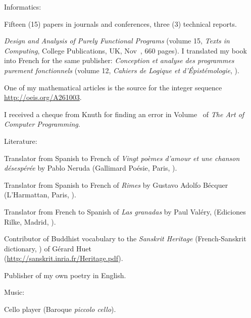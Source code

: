 \documentclass[a4paper,11pt]{article}
\begin{document}
\noindent Informatics:
\begin{itemize*}

  \item Fifteen (15) papers in journals and conferences, three (3)
    technical reports.

  \item \textit{Design and Analysis of Purely Functional Programs}
    (volume 15, \emph{Texts in Computing}, College Publications, UK,
    Nov~, 660 pages). I translated my book into
    French for the same publisher: \textit{Conception et analyse des
      programmes purement fonctionnels} (volume 12, \emph{Cahiers de
    Logique et d'Épistémologie}, ).

  \item One of my mathematical articles is the source for the integer
    sequence \url{http://oeis.org/A261003}.

  \item I received a cheque from Knuth for finding an error in
    Volume~ of \emph{The Art of Computer Programming}.

\end{itemize*}

\noindent Literature:
\begin{itemize*}
  \item Translator from Spanish to French of \textit{Vingt po\`emes
    d'amour et une chanson d\'esesp\'er\'ee} by Pablo Neruda
    (Gallimard Po\'esie, Paris, ).

  \item Translator from Spanish to French of \textit{Rimes} by Gustavo
    Adolfo B\'ecquer (L'Harmattan, Paris, ).

  \item Translator from French to Spanish of \emph{Las granadas} by
    Paul Val\'ery, (Ediciones Rilke, Madrid, ).

  \item Contributor of Buddhist vocabulary to the \emph{Sanskrit
  Heritage} (French-Sanskrit dictionary, ) of
    G\'{e}rard Huet\\ (\url{http://sanskrit.inria.fr/Heritage.pdf}).

  \item Publisher of my own poetry in English.
\end{itemize*}

\noindent Music:
\begin{itemize*}

  \item Cello player (Baroque \emph{piccolo cello}).

\end{itemize*}


%
\nocite{*}
\end{document}

